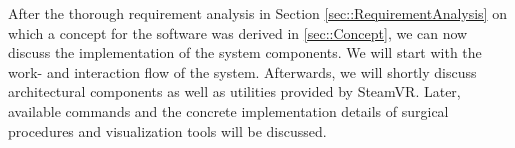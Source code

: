 After the thorough requirement analysis in Section \ref{sec::RequirementAnalysis} on which a concept for the software was derived in \ref{sec::Concept}, 
we can now discuss the implementation of the system components.
We will start with the work- and interaction flow of the system.
Afterwards, we will shortly discuss architectural components as well as utilities provided by SteamVR.
Later, available commands and the concrete implementation details of surgical procedures and visualization tools will be discussed.